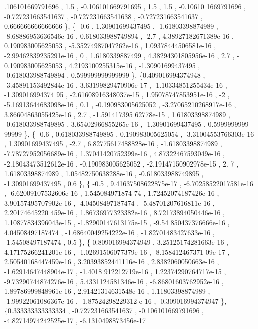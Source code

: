 \begin{DoxyCode}
      .106101669791696 ,               1.5 , -0.106101669791695 ,               1.5 ,               1.5 , -0.10610
      1669791696 , -0.727231663541637 , -0.727231663541638 , -0.727231663541637 , 0.666666666666666 \},
\{             -0.6 ,  1.30901699437495 , -1.61803398874989 , -8.68886953636546e-16 , 0.618033988749894 ,   
                 -2.7 , 4.38927182671389e-16 , 0.190983005625053 , -5.35274987047262e-16 , 1.09378444506581e-16 , 
      -2.99462839235291e-16 ,                 0 ,   1.6180339887499 , 4.38294301805956e-16 ,               2.7 , -
      0.190983005625053 , 4.2193100255315e-16 , -1.30901699437495 , -0.618033988749894 , 0.599999999999999 \},
\{0.409016994374948 , -3.45891153492844e-16 , 3.63199829470906e-17 , -1.10334851255434e-16 , -1.309016994374
      95 , -2.61608916348037e-15 , 1.95078747853951e-16 ,                -2 , -5.16913644683098e-16 ,             
        0.1 , -0.190983005625052 , -3.27065210268917e-16 , 3.86604863055425e-16 ,               2.7 , -1.591417395
      62778e-15 ,  1.61803398874989 , -0.618033988749895 , 3.65402966855265e-16 , -1.30901699437495 , 0.5999999999
      99999 \},
\{             -0.6 , 0.618033988749895 , 0.190983005625054 , -3.31004553766303e-16 ,  1.30901699437495 ,   
                 -2.7 , 6.82775617488828e-16 , -1.61803398874989 , -7.78727952056689e-16 , 1.37041420752399e-16 , 
      4.87322467593049e-16 , -2.18043473512612e-16 , -0.190983005625052 , -2.19147150902978e-15 ,               2.
      7 ,  1.61803398874989 , 1.05482750638288e-16 , -0.618033988749895 , -1.30901699437495 ,               0.6 \},
\{             -0.5 , 9.41637508622875e-17 , -6.70258522017581e-16 , -6.62009107532606e-16 ,  1.545084971874
      74 , 1.72452074187426e-16 , 3.90157495707902e-16 , -4.04508497187474 , -5.48701207616811e-16 , 2.20174645220
      459e-16 , 1.86736977323382e-16 , 8.72173894050446e-16 , 1.10877834396043e-15 , -1.82900147613175e-15 , -9.54
      850437376666e-16 ,  4.04508497187474 , -1.68640049254222e-16 , -1.82701483427633e-16 , -1.54508497187474 ,  
                   0.5 \},
\{-0.809016994374949 , 3.25125174281663e-16 , 4.17175266241201e-16 , -1.02691506077379e-16 , -8.158412467371
      09e-17 , 2.50540168447459e-16 , 3.20393852441116e-16 , 2.8382060050663e-16 , -1.62914647448904e-17 , -1.4018
      912212719e-16 , 1.22374290764717e-15 , -9.73290744874276e-16 , 5.4331124581346e-16 , -6.86801603762952e-16 ,
       1.89786999848961e-16 , 2.91421314631548e-16 ,  1.11803398874989 , -1.99922061086367e-16 , -1.87524298229312
      e-16 , -0.309016994374947 \},
\{0.333333333333334 , -0.727231663541637 , -0.106101669791696 , -4.82714974242525e-17 , -6.1310498873456e-17

\end{DoxyCode}
